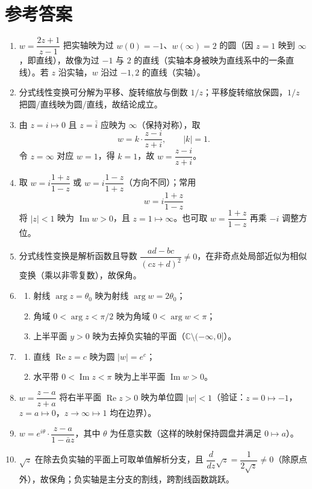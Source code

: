 \section{参考答案}\label{ux53c2ux8003ux7b54ux6848-5}

\begin{enumerate}
\def\labelenumi{\arabic{enumi}.}
\item
  \(w=\dfrac{2z+1}{z-1}\) 把实轴映为过 \(w(0)=-1\)、\(w(\infty)=2\)
  的圆（因 \(z=1\) 映到 \(\infty\)，即直线），故像为过 \(-1\) 与 \(2\)
  的直线（实轴本身被映为直线系中的一条直线）。若 \(z\) 沿实轴，\(w\)
  沿过 \(-1,2\) 的直线（实轴）。
\item
  分式线性变换可分解为平移、旋转缩放与倒数
  \(1/z\)；平移旋转缩放保圆，\(1/z\) 把圆/直线映为圆/直线，故结论成立。
\item
  由 \(z=i\mapsto0\) 且 \(z=\bar i\) 应映为 \(\infty\)（保持对称），取
  \[
  w=k\cdot\frac{z-i}{z+i},\qquad |k|=1 .
  \] 令 \(z=\infty\) 对应 \(w=1\)，得 \(k=1\)，故
  \(w=\dfrac{z-i}{z+i}\)。
\item
  取 \(w=i\dfrac{1+z}{1-z}\) 或
  \(w=i\dfrac{1-z}{1+z}\)（方向不同）；常用 \[
  w=i\frac{1+z}{1-z}
  \] 将 \(|z|<1\) 映为 \(\operatorname{Im}w>0\)，且
  \(z=1\mapsto\infty\)。也可取 \(w=\dfrac{1+z}{1-z}\) 再乘 \(-i\)
  调整方位。
\item
  分式线性变换是解析函数且导数
  \(\dfrac{ad-bc}{(cz+d)^2}\neq0\)，在非奇点处局部近似为相似变换（乘以非零复数），故保角。
\item
  \begin{enumerate}
  \def\labelenumii{(\arabic{enumii})}
  \tightlist
  \item
    射线 \(\arg z=\theta_0\) 映为射线 \(\arg w=2\theta_0\)；
  \item
    角域 \(0<\arg z<\pi/2\) 映为角域 \(0<\arg w<\pi\)；
  \item
    上半平面 \(y>0\)
    映为去掉负实轴的平面（\(\mathbb{C}\setminus(-\infty,0]\)）。
  \end{enumerate}
\item
  \begin{enumerate}
  \def\labelenumii{(\arabic{enumii})}
  \tightlist
  \item
    直线 \(\operatorname{Re}z=c\) 映为圆 \(|w|=e^c\)；
  \item
    水平带 \(0<\operatorname{Im}z<\pi\) 映为上半平面
    \(\operatorname{Im}w>0\)。
  \end{enumerate}
\item
  \(w=\dfrac{z-a}{z+a}\) 将右半平面 \(\operatorname{Re}z>0\) 映为单位圆
  \(|w|<1\)（验证：\(z=0\mapsto-1\)，\(z=a\mapsto0\)，\(z\to\infty\mapsto1\)
  均在边界）。
\item
  \(w=e^{i\theta}\cdot\dfrac{z-a}{1-\bar a z}\)，其中 \(\theta\)
  为任意实数（这样的映射保持圆盘并满足 \(0\mapsto a\)）。
\item
  \(\sqrt z\) 在除去负实轴的平面上可取单值解析分支，且
  \(\dfrac{d}{dz}\sqrt z=\dfrac1{2\sqrt z}\neq0\)（除原点外），故保角；负实轴是主分支的割线，跨割线函数跳跃。
\end{enumerate}
